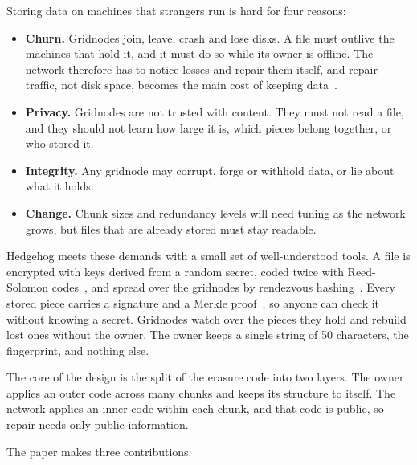 \documentclass[10pt,a4paper,final]{article}
\begin{document}
Storing data on machines that strangers run is hard for four reasons:

\begin{itemize}
	\item \textbf{Churn.} Gridnodes join, leave, crash and lose disks. A file must outlive the machines that hold
	      it, and it must do so while its owner is offline. The network therefore has to notice losses and repair them
	      itself, and repair traffic, not disk space, becomes the main cost of keeping data~\cite{blake2003}.
	\item \textbf{Privacy.} Gridnodes are not trusted with content. They must not read a file, and they should not
	      learn how large it is, which pieces belong together, or who stored it.
	\item \textbf{Integrity.} Any gridnode may corrupt, forge or withhold data, or lie about what it holds.
	\item \textbf{Change.} Chunk sizes and redundancy levels will need tuning as the network grows, but files that
	      are already stored must stay readable.
\end{itemize}

Hedgehog meets these demands with a small set of well-understood tools. A file is encrypted with keys derived from
a random secret, coded twice with Reed-Solomon codes~\cite{reed1960}, and spread over the gridnodes by rendezvous
hashing~\cite{thaler1998}. Every stored piece carries a signature and a Merkle proof~\cite{merkle1987}, so anyone
can check it without knowing a secret. Gridnodes watch over the pieces they hold and rebuild lost ones without the
owner. The owner keeps a single string of 50 characters, the fingerprint, and nothing else.

The core of the design is the split of the erasure code into two layers. The owner applies an outer code across
many chunks and keeps its structure to itself. The network applies an inner code within each chunk, and that code
is public, so repair needs only public information.

The paper makes three contributions:
\end{document}
